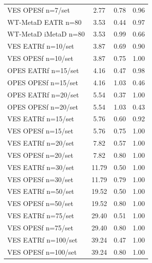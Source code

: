 \begin{longtable}{lccc}
VES OPESf n=7/set & 2.77 & 0.78 & 0.96 \\
WT-MetaD EATR n=80 & 3.53 & 0.44 & 0.97 \\
WT-MetaD iMetaD n=80 & 3.53 & 0.99 & 0.66 \\
VES EATRf n=10/set & 3.87 & 0.69 & 0.90 \\
VES OPESf n=10/set & 3.87 & 0.75 & 1.00 \\
OPES EATRf n=15/set & 4.16 & 0.47 & 0.98 \\
OPES OPESf n=15/set & 4.16 & 1.03 & 0.46 \\
OPES EATRf n=20/set & 5.54 & 0.37 & 1.00 \\
OPES OPESf n=20/set & 5.54 & 1.03 & 0.43 \\
VES EATRf n=15/set & 5.76 & 0.60 & 0.92 \\
VES OPESf n=15/set & 5.76 & 0.75 & 1.00 \\
VES EATRf n=20/set & 7.82 & 0.57 & 1.00 \\
VES OPESf n=20/set & 7.82 & 0.80 & 1.00 \\
VES EATRf n=30/set & 11.79 & 0.50 & 1.00 \\
VES OPESf n=30/set & 11.79 & 0.79 & 1.00 \\
VES EATRf n=50/set & 19.52 & 0.50 & 1.00 \\
VES OPESf n=50/set & 19.52 & 0.80 & 1.00 \\
VES EATRf n=75/set & 29.40 & 0.51 & 1.00 \\
VES OPESf n=75/set & 29.40 & 0.80 & 1.00 \\
VES EATRf n=100/set & 39.24 & 0.47 & 1.00 \\
VES OPESf n=100/set & 39.24 & 0.80 & 1.00\\ \bottomrule
\end{longtable}
